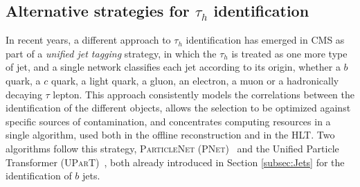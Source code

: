 %








\subsection{Alternative strategies for \texorpdfstring{$\tau_h$}{τh} identification}
\label{subsec:PNet}
%
In recent years, a different approach to $\tau_h$ identification has emerged in CMS as part of a \textit{unified jet tagging} strategy, in which the $\tau_h$ is treated as one more type of jet, and a single network classifies each jet according to its origin, whether a $b$ quark, a $c$ quark, a light quark, a gluon, an electron, a muon or a hadronically decaying $\tau$ lepton. This approach consistently models the correlations between the identification of the different objects, allows the selection to be optimized against specific sources of contamination, and concentrates computing resources in a single algorithm, used both in the offline reconstruction and in the HLT. Two algorithms follow this strategy, \textsc{ParticleNet} (\textsc{PNet})~\cite{PNet} and the Unified Particle Transformer (\textsc{UParT})~\cite{Qu:2022mxj,CMS-UParT}, both already introduced in Section \ref{subsec:Jets} for the identification of $b$ jets. 


